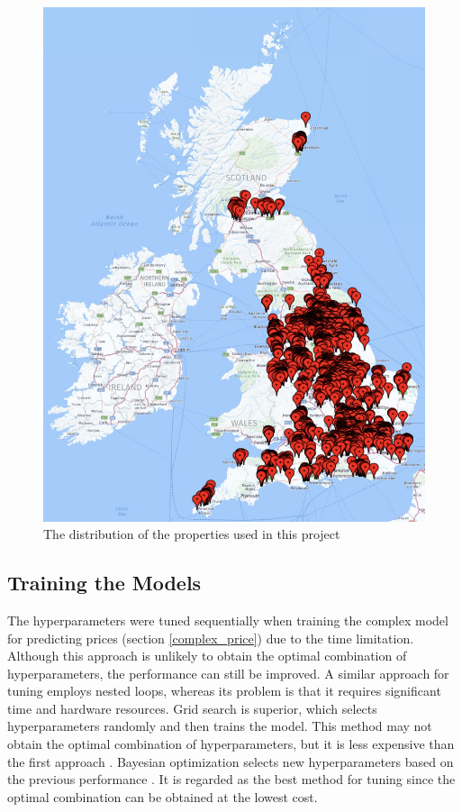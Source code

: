 \documentclass[12pt,twoside]{report}
\begin{document}
\begin{figure}[H]
	\centering
	\includegraphics[width=\linewidth]{uk_distribution}
	\caption{The distribution of the properties used in this project}
	\label{uk_distribution}
\end{figure}

\subsection{Training the Models}
The hyperparameters were tuned sequentially when training the complex model for predicting prices (section \ref{complex_price}) due to the time limitation. Although this approach is unlikely to obtain the optimal combination of hyperparameters, the performance can still be improved. A similar approach for tuning employs nested loops, whereas its problem is that it requires significant time and hardware resources. Grid search is superior, which selects hyperparameters randomly and then trains the model. This method may not obtain the optimal combination of hyperparameters, but it is less expensive than the first approach \citep{RN38}. Bayesian optimization selects new hyperparameters based on the previous performance \citep{RN38}. It is regarded as the best method for tuning since the optimal combination can be obtained at the lowest cost. 
\end{document}
